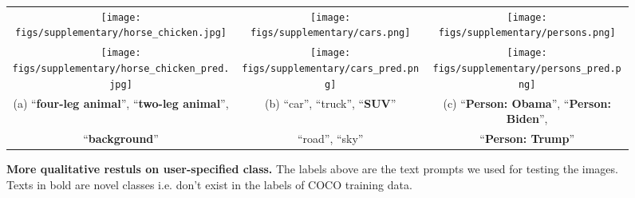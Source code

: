 \documentclass{article}
\theoremstyle{plain}
\theoremstyle{definition}
\theoremstyle{remark}
\begin{document}
\begin{figure*}[!htbp]
\begin{center}
\begin{tabular}{ccc}

\texttt{[image: figs/supplementary/horse\_chicken.jpg]} & \hspace{-2mm}
\texttt{[image: figs/supplementary/cars.png]} & \hspace{-5mm}
\texttt{[image: figs/supplementary/persons.png]}
\\

\texttt{[image: figs/supplementary/horse\_chicken\_pred.jpg]} &  \hspace{-2mm}
\texttt{[image: figs/supplementary/cars\_pred.png]} &\hspace{-5mm}
\texttt{[image: figs/supplementary/persons\_pred.png]}
\\

(a) {\scriptsize ``\textbf{four-leg animal}'', ``\textbf{two-leg animal}'',}  & (b) {\scriptsize ``car'', ``truck'', ``\textbf{SUV}''}  & (c) {\scriptsize ``\textbf{Person: Obama}'', ``\textbf{Person: Biden}'',}  \\
{\scriptsize ``\textbf{background}''} & {\scriptsize ``road'', ``sky''} & {\scriptsize ``\textbf{Person: Trump}''}
\end{tabular}

\caption{\small \textbf{More qualitative restuls on user-specified class.} The labels above are the text prompts we used for testing the images. Texts in bold are novel classes i.e. don't exist in the labels of COCO training data.}
\label{fig:app_novel}
\end{center}
\end{figure*}
\end{document}
